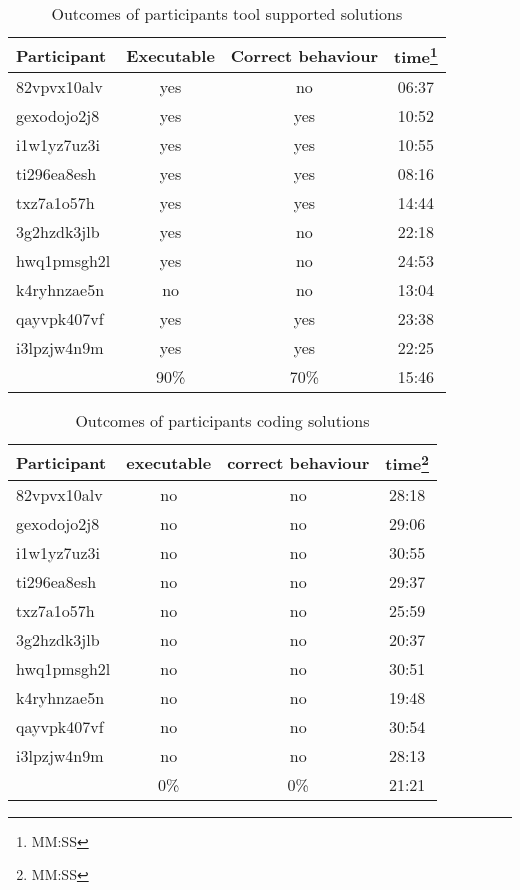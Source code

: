 \begin{table}[htbp]
    \begin{minipage}{0.8\textwidth}
        \centering
        \begin{tabular}{l c c c}
            \toprule
            Participant & Executable & Correct behaviour & time\footnote{MM:SS}\\
            \midrule
            82vpvx10alv & yes & no & 06:37 \\
            gexodojo2j8 & yes & yes & 10:52 \\
            i1w1yz7uz3i & yes & yes & 10:55 \\
            ti296ea8esh & yes & yes & 08:16 \\
            txz7a1o57h & yes & yes & 14:44 \\
            3g2hzdk3jlb & yes & no & 22:18 \\
            hwq1pmsgh2l & yes & no & 24:53 \\
            k4ryhnzae5n & no & no & 13:04 \\
            qayvpk407vf & yes & yes & 23:38 \\
            i3lpzjw4n9m & yes & yes & 22:25 \\
            \bottomrule
            & 90\% & 70\% & 15:46
        \end{tabular}
        \caption{Outcomes of participants tool supported solutions}
        \label{tab:SucessRateBlocklyUseCase1}
    \end{minipage}
\end{table}

\begin{table}[htbp]
    \begin{minipage}{0.8\textwidth}
    \centering
        \begin{tabular}{l c c c}
            \toprule
            Participant & executable & correct behaviour & time\footnote{MM:SS} \\
            \midrule
            82vpvx10alv & no & no & 28:18 \\
            gexodojo2j8  & no & no & 29:06 \\
            i1w1yz7uz3i  & no & no & 30:55 \\
            ti296ea8esh  & no & no & 29:37 \\
            txz7a1o57h & no & no & 25:59 \\
            3g2hzdk3jlb  & no & no & 20:37 \\
            hwq1pmsgh2l  & no & no & 30:51 \\
            k4ryhnzae5n  & no & no & 19:48 \\
            qayvpk407vf  & no & no & 30:54 \\
            i3lpzjw4n9m  & no & no & 28:13\\
            \bottomrule
            & 0\% & 0\% & 21:21
        \end{tabular}
        \caption{Outcomes of participants coding solutions}
        \label{tab:SucessRateCodeUseCase1}
    \end{minipage}
\end{table}

